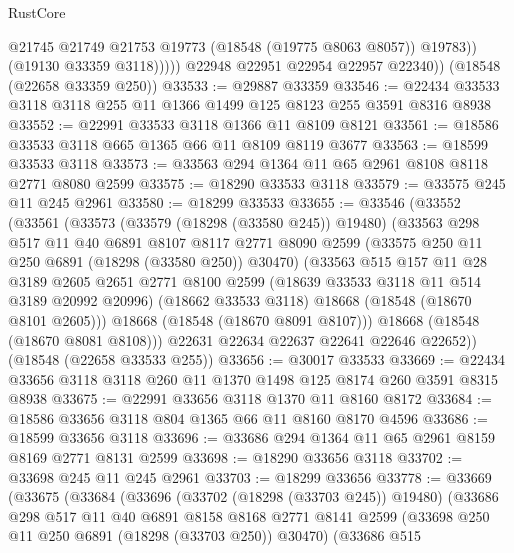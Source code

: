 \begin{lexlean}{RustCore}
\begin{coremodule}
                    @21745
                    @21749
                    @21753
                    @19773
                    (@18548 (@19775 @8063 @8057))
                    @19783))
                (@19130 @33359 @3118)))))
        @22948
        @22951
        @22954
        @22957
        @22340))
    (@18548 (@22658 @33359 @250))
@33533 := @29887 @33359
@33546 := @22434 @33533 @3118 @3118 @255 @11 @1366 @1499 @125 @8123 @255 @3591 @8316 @8938
@33552 := @22991 @33533 @3118 @1366 @11 @8109 @8121
@33561 := @18586 @33533 @3118 @665 @1365 @66 @11 @8109 @8119 @3677
@33563 := @18599 @33533 @3118
@33573 := @33563 @294 @1364 @11 @65 @2961 @8108 @8118 @2771 @8080 @2599
@33575 := @18290 @33533 @3118
@33579 := @33575 @245 @11 @245 @2961
@33580 := @18299 @33533
@33655 := @33546
    (@33552
      (@33561
        (@33573
          (@33579 (@18298 (@33580 @245)) @19480)
          (@33563
            @298
            @517
            @11
            @40
            @6891
            @8107
            @8117
            @2771
            @8090
            @2599
            (@33575 @250 @11 @250 @6891 (@18298 (@33580 @250)) @30470)
            (@33563
              @515
              @157
              @11
              @28
              @3189
              @2605
              @2651
              @2771
              @8100
              @2599
              (@18639 @33533 @3118 @11 @514 @3189 @20992 @20996)
              (@18662 @33533 @3118)
              @18668
              (@18548 (@18670 @8101 @2605)))
            @18668
            (@18548 (@18670 @8091 @8107)))
          @18668
          (@18548 (@18670 @8081 @8108)))
        @22631
        @22634
        @22637
        @22641
        @22646
        @22652))
    (@18548 (@22658 @33533 @255))
@33656 := @30017 @33533
@33669 := @22434 @33656 @3118 @3118 @260 @11 @1370 @1498 @125 @8174 @260 @3591 @8315 @8938
@33675 := @22991 @33656 @3118 @1370 @11 @8160 @8172
@33684 := @18586 @33656 @3118 @804 @1365 @66 @11 @8160 @8170 @4596
@33686 := @18599 @33656 @3118
@33696 := @33686 @294 @1364 @11 @65 @2961 @8159 @8169 @2771 @8131 @2599
@33698 := @18290 @33656 @3118
@33702 := @33698 @245 @11 @245 @2961
@33703 := @18299 @33656
@33778 := @33669
    (@33675
      (@33684
        (@33696
          (@33702 (@18298 (@33703 @245)) @19480)
          (@33686
            @298
            @517
            @11
            @40
            @6891
            @8158
            @8168
            @2771
            @8141
            @2599
            (@33698 @250 @11 @250 @6891 (@18298 (@33703 @250)) @30470)
            (@33686
              @515

\end{coremodule}
\end{lexlean}
